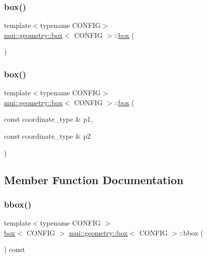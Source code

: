 \subsubsection{\texorpdfstring{box()}{box()}\hspace{0.1cm}{\footnotesize\ttfamily [1/2]}}
{\footnotesize\ttfamily template$<$typename C\+O\+N\+F\+IG$>$ \\
\hyperlink{classmui_1_1geometry_1_1box}{mui\+::geometry\+::box}$<$ C\+O\+N\+F\+IG $>$\+::\hyperlink{classmui_1_1geometry_1_1box}{box} (\begin{DoxyParamCaption}{ }\end{DoxyParamCaption})\hspace{0.3cm}{\ttfamily [default]}}

\mbox{\label{classmui_1_1geometry_1_1box_a4b31077f538bd68d1120d4f1a458cd86}} 
\subsubsection{\texorpdfstring{box()}{box()}\hspace{0.1cm}{\footnotesize\ttfamily [2/2]}}
{\footnotesize\ttfamily template$<$typename C\+O\+N\+F\+IG$>$ \\
\hyperlink{classmui_1_1geometry_1_1box}{mui\+::geometry\+::box}$<$ C\+O\+N\+F\+IG $>$\+::\hyperlink{classmui_1_1geometry_1_1box}{box} (\begin{DoxyParamCaption}\item[{const coordinate\+\_\+type \&}]{p1,  }\item[{const coordinate\+\_\+type \&}]{p2 }\end{DoxyParamCaption})\hspace{0.3cm}{\ttfamily [inline]}}



\subsection{Member Function Documentation}
\mbox{\label{classmui_1_1geometry_1_1box_a900ea59f5e2745d18664690dc52c642b}} 
\subsubsection{\texorpdfstring{bbox()}{bbox()}}
{\footnotesize\ttfamily template$<$typename C\+O\+N\+F\+IG $>$ \\
\hyperlink{classmui_1_1geometry_1_1box}{box}$<$ C\+O\+N\+F\+IG $>$ \hyperlink{classmui_1_1geometry_1_1box}{mui\+::geometry\+::box}$<$ C\+O\+N\+F\+IG $>$\+::bbox (\begin{DoxyParamCaption}{ }\end{DoxyParamCaption}) const\hspace{0.3cm}{\ttfamily [virtual]}}



